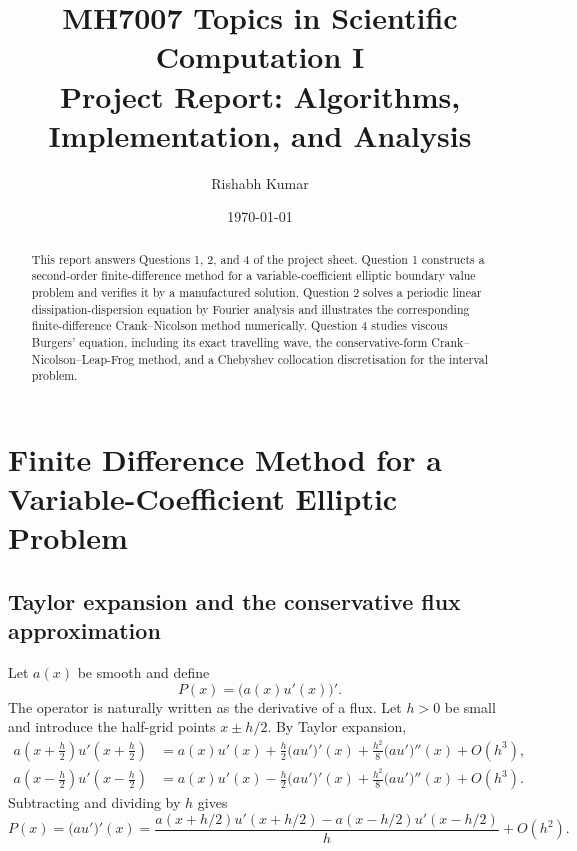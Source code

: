 \documentclass[11pt]{article}
\title{MH7007 Topics in Scientific Computation I\\
\large Project Report: Algorithms, Implementation, and Analysis}
\author{Rishabh Kumar}
\date{\today}
\begin{document}
\maketitle

\begin{abstract}
This report answers Questions 1, 2, and 4 of the project sheet.  Question 1 constructs a second-order finite-difference method for a variable-coefficient elliptic boundary value problem and verifies it by a manufactured solution.  Question 2 solves a periodic linear dissipation-dispersion equation by Fourier analysis and illustrates the corresponding finite-difference Crank--Nicolson method numerically.  Question 4 studies viscous Burgers' equation, including its exact travelling wave, the conservative-form Crank--Nicolson--Leap-Frog method, and a Chebyshev collocation discretisation for the interval problem.
\end{abstract}

\section{Finite Difference Method for a Variable-Coefficient Elliptic Problem}

\subsection{Taylor expansion and the conservative flux approximation}

Let $a(x)$ be smooth and define
\begin{equation}
    P(x) = \bigl(a(x)u'(x)\bigr)'.
\end{equation}
The operator is naturally written as the derivative of a flux.  Let $h>0$ be small and introduce the half-grid points $x\pm h/2$.  By Taylor expansion,
\begin{align}
    a\left(x+\frac{h}{2}\right)u'\left(x+\frac{h}{2}\right)
    &=
    a(x)u'(x)
    +\frac{h}{2}\bigl(a u'\bigr)'(x)
    +\frac{h^2}{8}\bigl(a u'\bigr)''(x)
    +O(h^3),\\
    a\left(x-\frac{h}{2}\right)u'\left(x-\frac{h}{2}\right)
    &=
    a(x)u'(x)
    -\frac{h}{2}\bigl(a u'\bigr)'(x)
    +\frac{h^2}{8}\bigl(a u'\bigr)''(x)
    +O(h^3).
\end{align}
Subtracting and dividing by $h$ gives
\begin{equation}
    P(x)=\bigl(a u'\bigr)'(x)
    =
    \frac{
    a(x+h/2)u'(x+h/2)-a(x-h/2)u'(x-h/2)
    }{h}
    +O(h^2).
\end{equation}
\end{document}
